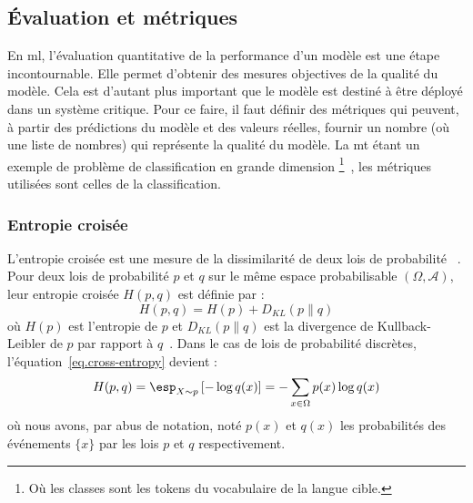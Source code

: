 \subsection{Évaluation et métriques}

En \gls{ml}, l'évaluation quantitative de la performance d'un modèle est une étape incontournable.
Elle permet d'obtenir des mesures objectives de la qualité du modèle.
Cela est d'autant plus important que le modèle est destiné à être déployé dans un système critique.
Pour ce faire, il faut définir des métriques qui peuvent, 
à partir des prédictions du modèle et des valeurs réelles,
fournir un nombre (où une liste de nombres) qui représente la qualité du modèle.
La \gls{mt} étant un exemple de problème de classification en grande dimension%
\footnote{%
Où les classes sont les tokens du vocabulaire de la langue cible.
}~\cite{deep-nmt-survey},
les métriques utilisées sont celles de la classification.

\subsubsection{Entropie croisée}

L'entropie croisée est une mesure de la dissimilarité de deux lois de probabilité%
~\cite{Vasilev_Slater_Spacagna_Roelants_Zocca_2019}.
Pour deux lois de probabilité \(p\) et \(q\) sur le même espace probabilisable \((\Omega, \mathcal{A})\),
leur entropie croisée \(H(p, q)\) est définie par :
\begin{equation}
    \label{eq.cross-entropy}
    H(p, q) = H(p) + D_{KL}(p \parallel q)
\end{equation}
où \(H(p)\) est l'entropie de \(p\) 
et \(D_{KL}(p \parallel q)\) est la divergence de Kullback-Leibler de \(p\) par rapport à \(q\)~\cite{Bishop_2006}.
Dans le cas de lois de probabilité discrètes, l'équation~\ref{eq.cross-entropy} devient :
\begin{equation}
    \label{eq.cross-entropy-discrete}
    H(p, q) = \esp_{X \sim p} \left[ - \log q(x) \right]
    = - \sum_{x \in \Omega} p(x) \log q(x)
\end{equation}
où nous avons, par abus de notation, noté \(p(x)\) et \(q(x)\) 
les probabilités des événements \(\{x\}\) par les lois \(p\) et \(q\) respectivement.

